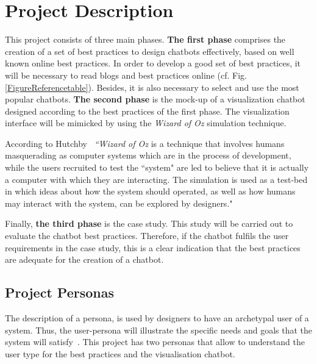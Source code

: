 \documentclass[a4paper,10pt]{article}
\begin{document}

\section*{Project Description}

This project consists of three main phases. \textbf{The first phase} comprises the creation of a set of best practices to design chatbots effectively, based on well known online best practices. In order to develop a good set of best practices, it will be necessary to read blogs and best practices online (cf. Fig. \ref{FigureReferencetable}). Besides, it is also necessary to select and use the most popular chatbots. 
\textbf{The second phase} is the mock-up of a visualization chatbot designed according to the best practices of the first phase. The visualization interface will be mimicked by using the \textit{Wizard of Oz} simulation technique. 
\begin{displayquote}
According to Hutchby~\cite{Hutchby2001} \textit{``Wizard of Oz} is a technique that involves humans masquerading as computer systems which are in the process of development, while the users recruited to test the ``system" are led to believe that it is actually a computer with which they are interacting.  The simulation is used as a test-bed in which ideas about how the system should operated, as well as how humans may interact with the system, can be explored by designers." 
\end{displayquote}

Finally, \textbf{the third phase} is the case study. This study will be carried out to evaluate the chatbot best practices. Therefore, if the chatbot fulfils the user requirements in the case study, this is a clear indication that the best practices are adequate for the creation of a chatbot.


 

\subsection*{Project Personas}
The description of a persona, is used by designers to have an archetypal user of a system. Thus, the user-persona will illustrate the specific needs and goals that the system will satisfy~\cite{cooper2004inmates}.
This project has two personas that allow to understand the user type for the best practices and the visualisation chatbot.  
\end{document}
